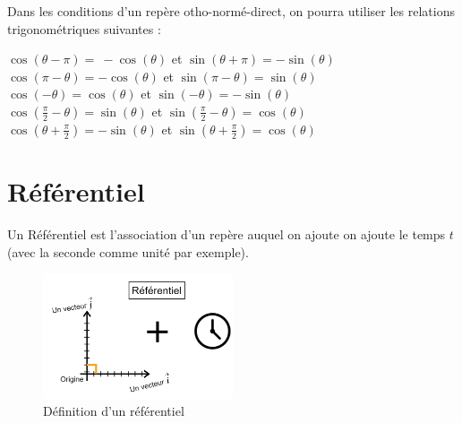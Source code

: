 \documentclass[
	11pt, %
	fleqn, %
	a4paper, %
]{LegrandOrangeBook}
\begin{document}
Dans les conditions d'un repère otho-normé-direct, on pourra utiliser les relations trigonométriques suivantes :

$\displaystyle \cos( \theta -\pi ) =\ -\cos( \theta )$ et $\displaystyle \sin( \theta +\pi ) =-\sin( \theta )$ \\

$\displaystyle \cos( \pi -\theta ) =-\cos( \theta )$ et $\displaystyle \sin( \pi -\theta ) =\sin( \theta )$ \\

$\displaystyle \cos( -\theta ) =\cos( \theta )$ et $\displaystyle \sin( -\theta ) =-\sin( \theta )$ \\

$\displaystyle \cos\left(\frac{\pi }{2} -\theta \right) =\sin( \theta )$ et $\displaystyle \sin\left(\frac{\pi }{2} -\theta \right) =\cos( \theta )$ \\

$\displaystyle \cos\left( \theta +\frac{\pi }{2}\right) =-\sin( \theta )$ et $\displaystyle \sin\left( \theta +\frac{\pi }{2}\right) =\cos( \theta )$ 

\section{Référentiel}

\begin{definition}
Un Référentiel est l'association d'un repère auquel on ajoute on ajoute le temps $t$ (avec la seconde comme unité par exemple).
\end{definition}

\begin{figure}[H] %
	\centering %
	\includegraphics[width=0.5\textwidth]{Images/ref1.png} %
	\caption{Définition d'un référentiel}
	\label{ref1} %
\end{figure}
\end{document}
